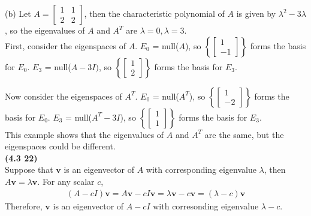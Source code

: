 (b) Let $A = \begin{bmatrix}
	1 & 1 \\ 2 & 2
\end{bmatrix}$, then the characteristic polynomial of $A$ is given by $\lambda^2 - 3\lambda$, so the eigenvalues of $A$ and $A^T$ are $\lambda = 0, \lambda = 3$. \\

First, consider the eigenspaces of $A$. $E_0$ = null($A$), so $\left \{ \begin{bmatrix}
	1 \\ -1
\end{bmatrix} \right \}$ forms the basis for $E_0$. $E_3$ = null($A - 3I)$, so $\left \{ \begin{bmatrix}
	1 \\ 2
\end{bmatrix} \right \}$ forms the basis for $E_3$.

Now consider the eigenspaces of $A^T$. $E_0$ = null($A^T$), so $\left \{  \begin{bmatrix}
	1 \\ -2
\end{bmatrix} \right \}$ forms the basis for $E_0$. $E_3$ = null($A^T - 3I$), so $\left \{  \begin{bmatrix}
	1 \\ 1
\end{bmatrix} \right \}$ forms the basis for $E_3$. \\

This example shows that the eigenvalues of $A$ and $A^T$ are the same, but the eigenspaces could be different. \\

\textbf{(4.3 22)} \\
Suppose that $\textbf{v}$ is an eigenvector of $A$ with corresponding eigenvalue $\lambda$, then $A\textbf{v} = \lambda\textbf{v}$. For any scalar $c$, \begin{align*}
	(A - cI)\textbf{v} = A\textbf{v} - cI\textbf{v} = \lambda\textbf{v} - c\textbf{v} = (\lambda - c)\textbf{v}
\end{align*}
Therefore, $\textbf{v}$ is an eigenvector of $A - cI$ with corresonding eigenvalue $\lambda - c$. \\

